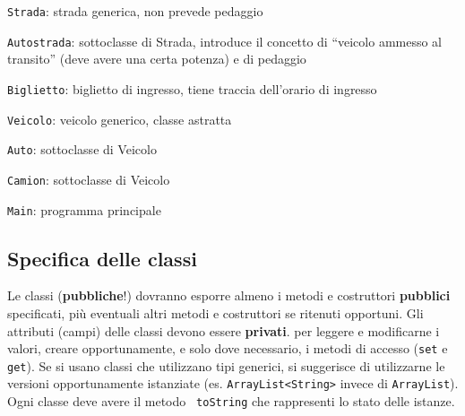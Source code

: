 \documentclass[a4paper,12pt]{article}
\begin{document}
\begin{compactenum}
\item \texttt{Strada}: strada generica, non prevede pedaggio

\item \texttt{Autostrada}: sottoclasse di Strada, introduce il concetto 
di ``veicolo ammesso al transito'' (deve avere una certa potenza) e di pedaggio

\item \texttt{Biglietto}: biglietto di ingresso, tiene traccia dell'orario di 
ingresso

\item \texttt{Veicolo}: veicolo generico, classe astratta

\item \texttt{Auto}: sottoclasse di Veicolo

\item \texttt{Camion}: sottoclasse di Veicolo



\item \texttt{Main}: programma principale

\end{compactenum}

\subsection{Specifica delle classi}

Le classi (\textbf{pubbliche}!) dovranno esporre almeno i metodi e costruttori \textbf{pubblici} specificati, più eventuali altri metodi e costruttori %
se ritenuti opportuni.
Gli attributi (campi) delle classi devono essere \textbf{privati}.
per leggere e modificarne i valori, 
creare opportunamente, e solo dove necessario, i metodi di accesso ({\tt set} e 
{\tt get}).
Se si usano classi che utilizzano tipi generici, si suggerisce  di utilizzarne 
le versioni opportunamente istanziate (es. \texttt{ArrayList<String>} invece di
\texttt{ArrayList}).
Ogni classe deve avere il metodo {\tt 
toString} che rappresenti lo stato delle istanze. 
\end{document}
